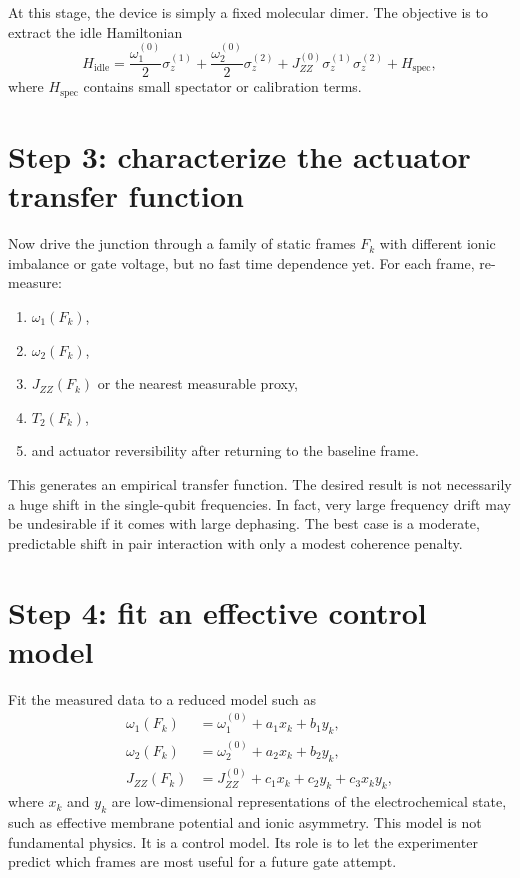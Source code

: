 \documentclass[11pt]{report}
\newcommand{\ham}{Hamiltonian}
\theoremstyle{definition}
\begin{document}
At this stage, the device is simply a fixed molecular dimer. The objective is to extract the idle \ham{}
\[
H_{\mathrm{idle}} = \frac{\omega_1^{(0)}}{2}\sigma_z^{(1)} + \frac{\omega_2^{(0)}}{2}\sigma_z^{(2)} + J_{ZZ}^{(0)}\sigma_z^{(1)}\sigma_z^{(2)} + H_{\mathrm{spec}},
\]
where $H_{\mathrm{spec}}$ contains small spectator or calibration terms.

\section{Step 3: characterize the actuator transfer function}
Now drive the junction through a family of static frames $F_k$ with different ionic imbalance or gate voltage, but no fast time dependence yet. For each frame, re-measure:

\begin{enumerate}[leftmargin=2em]
\item $\omega_1(F_k)$,
\item $\omega_2(F_k)$,
\item $J_{ZZ}(F_k)$ or the nearest measurable proxy,
\item $T_2(F_k)$,
\item and actuator reversibility after returning to the baseline frame.
\end{enumerate}

This generates an empirical transfer function. The desired result is not necessarily a huge shift in the single-qubit frequencies. In fact, very large frequency drift may be undesirable if it comes with large dephasing. The best case is a moderate, predictable shift in pair interaction with only a modest coherence penalty.

\section{Step 4: fit an effective control model}
Fit the measured data to a reduced model such as
\begin{align}
\omega_1(F_k) &= \omega_1^{(0)} + a_1 x_k + b_1 y_k, \\
\omega_2(F_k) &= \omega_2^{(0)} + a_2 x_k + b_2 y_k, \\
J_{ZZ}(F_k) &= J_{ZZ}^{(0)} + c_1 x_k + c_2 y_k + c_3 x_k y_k,
\end{align}
where $x_k$ and $y_k$ are low-dimensional representations of the electrochemical state, such as effective membrane potential and ionic asymmetry. This model is not fundamental physics. It is a control model. Its role is to let the experimenter predict which frames are most useful for a future gate attempt.
\end{document}
